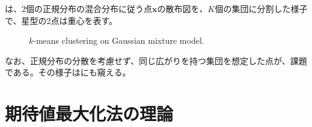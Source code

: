 \documentclass[10pt,a4paper]{book}
\begin{document}
は、2個の正規分布の混合分布に従う点$\bm{x}$の散布図を、$K$個の集団に分割した様子で、星型の2点は重心を表す。

\begin{figure}[h]
\centering
{}
\caption{$k$-means clustering on Gaussian mixture model.\label{fig:kmean}}
\end{figure}

なお、正規分布の分散を考慮せず、同じ広がりを持つ集団を想定した点が、課題である。その様子はにも窺える。

\section{期待値最大化法の理論\label{sect:em}}
\end{document}
